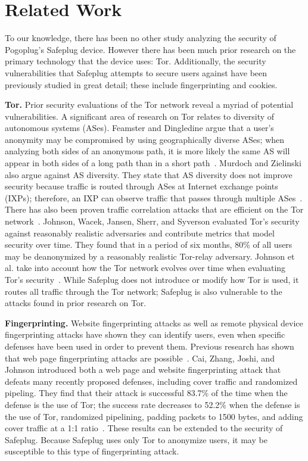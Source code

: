 \documentclass[letterpaper,twocolumn,10pt]{article}
\begin{document}
\section{Related Work}
To our knowledge, there has been no other study analyzing the security of Pogoplug's Safeplug device.  However there has been much prior research on the primary technology that the device uses: Tor.  Additionally, the security vulnerabilities that Safeplug attempts to secure users against have been previously studied in great detail; these include fingerprinting and cookies.  

{\bf Tor.} Prior security evaluations of the Tor network reveal a myriad of potential vulnerabilities.  A significant area of research on Tor relates to diversity of autonomous systems (ASes).  Feamster and Dingledine argue that a user's anonymity may be compromised by using geographically diverse ASes; when analyzing both sides of an anonymous path, it is more likely the same AS will appear in both sides of a long path than in a short path~\cite{feamster}.  Murdoch and Zielinski also argue against AS diversity.  They state that AS diversity does not improve security because traffic is routed through ASes at Internet exchange points (IXPs); therefore, an IXP can observe traffic that passes through multiple ASes~\cite{murdoch2}.  There has also been proven traffic correlation attacks that are efficient on the Tor network~\cite{murdoch, overlier}.  Johnson, Wacek, Jansen, Sherr, and Syverson evaluated Tor's security against reasonably realistic adversaries and contribute metrics that model security over time.  They found that in a period of six months, 80\% of all users may be deanonymized by a reasonably realistic Tor-relay adversary.  Johnson et al. take into account how the Tor network evolves over time when evaluating Tor's security~\cite{tor2}.  While Safeplug does not introduce or modify how Tor is used, it routes all traffic through the Tor network; Safeplug is also vulnerable to the attacks found in prior research on Tor.  

{\bf Fingerprinting.}  Website fingerprinting attacks as well as remote physical device fingerprinting attacks have shown they can identify users, even when specific defenses have been used in order to prevent them. Previous research has shown that web page fingerprinting attacks are possible~\cite{dyer, herrmann, panchenko}.  Cai, Zhang, Joshi, and Johnson introduced both a web page and website fingerprinting attack that defeats many recently proposed defenses, including cover traffic and randomized pipeling.  They find that their attack is successful 83.7\% of the time when the defense is the use of Tor; the success rate decreases to 52.2\% when the defense is the use of Tor, randomized pipelining, padding packets to 1500 bytes, and adding cover traffic at a 1:1 ratio~\cite{fingerprint1}.  These results can be extended to the security of Safeplug.  Because Safeplug uses only Tor to anonymize users, it may be susceptible to this type of fingerprinting attack.
\end{document}
